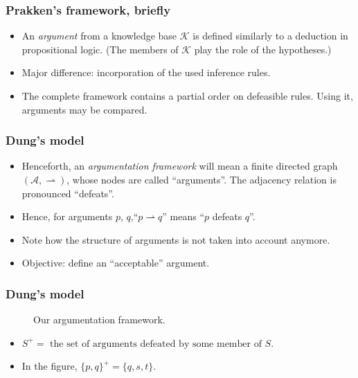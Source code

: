 \documentclass{beamer}
\begin{document}
\begin{frame}
\frametitle{Prakken's framework, briefly}
\begin{itemize}
\item An \emph{argument} from a knowledge base $\mathcal{K}$ is defined similarly to a deduction in propositional logic. (The members of $\mathcal{K}$ play the role of the hypotheses.) \pause
\item Major difference: incorporation of the used inference rules. \pause
\item The complete framework contains a partial order on defeasible rules. Using it, arguments may be compared.
\end{itemize}
\end{frame}

\begin{frame}
\frametitle{Dung's model}
\begin{itemize}
\item Henceforth, an \emph{argumentation framework} will mean a finite directed graph \( (\mathcal{A}, \rightharpoonup) \), whose nodes are called ``arguments''. The adjacency relation is pronounced ``defeats''. \pause
\item Hence, for arguments $p$, $q$,\quad ``$p \rightharpoonup q$'' means ``$p$ defeats $q$''. \pause
\item Note how the structure of arguments is not taken into account anymore. \pause
\item Objective: define an ``acceptable'' argument.
\end{itemize}
\end{frame}

\begin{frame}
\frametitle{Dung's model}
\begin{figure}
\centering
{}
\caption{Our argumentation framework.} \label{af}
\end{figure}
\begin{itemize}
\item \( S^{+} = \mbox{ the set of arguments defeated by some member of } S \). \pause
\item In the figure, \( \{ p, q \}^{+} = \{ q, s, t \} \).
\end{itemize}
\end{frame}
\end{document}
